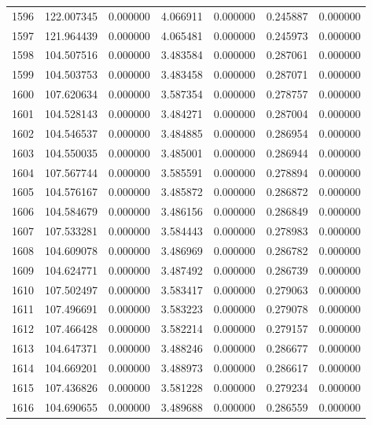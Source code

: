\begin{tabular}{rrrrrrr}
1596 & 122.007345 &    0.000000 &  4.066911 &   0.000000 &   0.245887 &  0.000000 \\
1597 & 121.964439 &    0.000000 &  4.065481 &   0.000000 &   0.245973 &  0.000000 \\
1598 & 104.507516 &    0.000000 &  3.483584 &   0.000000 &   0.287061 &  0.000000 \\
1599 & 104.503753 &    0.000000 &  3.483458 &   0.000000 &   0.287071 &  0.000000 \\
1600 & 107.620634 &    0.000000 &  3.587354 &   0.000000 &   0.278757 &  0.000000 \\
1601 & 104.528143 &    0.000000 &  3.484271 &   0.000000 &   0.287004 &  0.000000 \\
1602 & 104.546537 &    0.000000 &  3.484885 &   0.000000 &   0.286954 &  0.000000 \\
1603 & 104.550035 &    0.000000 &  3.485001 &   0.000000 &   0.286944 &  0.000000 \\
1604 & 107.567744 &    0.000000 &  3.585591 &   0.000000 &   0.278894 &  0.000000 \\
1605 & 104.576167 &    0.000000 &  3.485872 &   0.000000 &   0.286872 &  0.000000 \\
1606 & 104.584679 &    0.000000 &  3.486156 &   0.000000 &   0.286849 &  0.000000 \\
1607 & 107.533281 &    0.000000 &  3.584443 &   0.000000 &   0.278983 &  0.000000 \\
1608 & 104.609078 &    0.000000 &  3.486969 &   0.000000 &   0.286782 &  0.000000 \\
1609 & 104.624771 &    0.000000 &  3.487492 &   0.000000 &   0.286739 &  0.000000 \\
1610 & 107.502497 &    0.000000 &  3.583417 &   0.000000 &   0.279063 &  0.000000 \\
1611 & 107.496691 &    0.000000 &  3.583223 &   0.000000 &   0.279078 &  0.000000 \\
1612 & 107.466428 &    0.000000 &  3.582214 &   0.000000 &   0.279157 &  0.000000 \\
1613 & 104.647371 &    0.000000 &  3.488246 &   0.000000 &   0.286677 &  0.000000 \\
1614 & 104.669201 &    0.000000 &  3.488973 &   0.000000 &   0.286617 &  0.000000 \\
1615 & 107.436826 &    0.000000 &  3.581228 &   0.000000 &   0.279234 &  0.000000 \\
1616 & 104.690655 &    0.000000 &  3.489688 &   0.000000 &   0.286559 &  0.000000 \\

\end{tabular}
